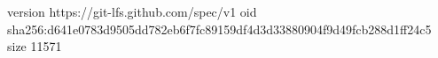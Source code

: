version https://git-lfs.github.com/spec/v1
oid sha256:d641e0783d9505dd782eb6f7fc89159df4d3d33880904f9d49fcb288d1ff24c5
size 11571
